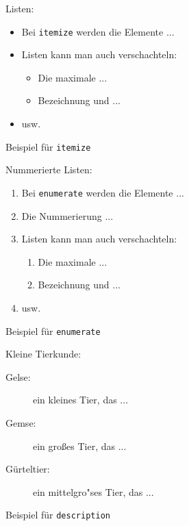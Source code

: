 \begin{figure}[!htbp]
\begin{LTXexample}
Listen:
\begin{itemize}

\item Bei \texttt{itemize}
werden die Elemente ...

\item Listen kann man auch
verschachteln:
  \begin{itemize}
  \item Die maximale ...
  \item Bezeichnung und ...
  \end{itemize}

\item usw.

\end{itemize}
\end{LTXexample}
\caption{Beispiel für \texttt{itemize}} \label{item}
%
%
\begin{LTXexample}
Nummerierte Listen:
\begin{enumerate}

\item Bei \texttt{enumerate}
werden die Elemente ...

\item Die Nummerierung ...

\item Listen kann man auch
verschachteln:
  \begin{enumerate}
  \item Die maximale ...
  \item Bezeichnung und ...
  \end{enumerate}

\item usw.

\end{enumerate}
\end{LTXexample}
\caption{Beispiel für \texttt{enumerate}} \label{enum}
\end{figure}

\begin{figure}[!htbp]  %
\begin{LTXexample}
Kleine Tierkunde:
\begin{description}
\item[Gelse:]
   ein kleines Tier, das ...
\item[Gemse:]
   ein gro\ss es Tier, das ...
\item[Gürteltier:]
   ein mittelgro"ses Tier, das ...
\end{description}
\end{LTXexample}

\caption{Beispiel für \texttt{description}} \label{desc}
\end{figure}


